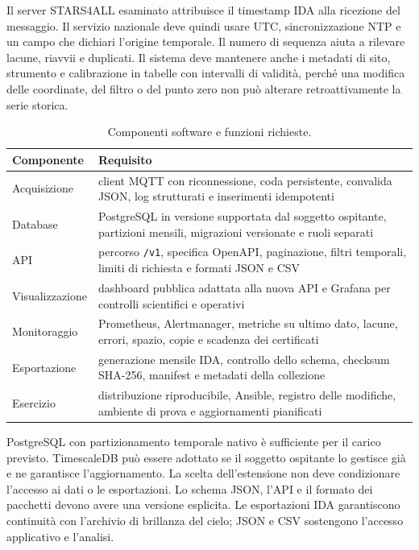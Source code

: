 \documentclass[11pt,a4paper]{report}
\begin{document}
Il server STARS4ALL esaminato attribuisce il timestamp IDA alla ricezione del messaggio. Il servizio nazionale deve quindi usare UTC, sincronizzazione NTP e un campo che dichiari l'origine temporale. Il numero di sequenza aiuta a rilevare lacune, riavvii e duplicati. Il sistema deve mantenere anche i metadati di sito, strumento e calibrazione in tabelle con intervalli di validità, perché una modifica delle coordinate, del filtro o del punto zero non può alterare retroattivamente la serie storica.

\begin{table}[ht!]
\centering
\renewcommand{\arraystretch}{1.5}
\small

\begin{tabularx}{\linewidth}{@{}l X@{}}
\toprule
Componente & Requisito \\
\midrule
Acquisizione & client MQTT con riconnessione, coda persistente, convalida JSON, log strutturati e inserimenti idempotenti \\
Database & PostgreSQL in versione supportata dal soggetto ospitante, partizioni mensili, migrazioni versionate e ruoli separati \\
API & percorso \texttt{/v1}, specifica OpenAPI, paginazione, filtri temporali, limiti di richiesta e formati JSON e CSV \\
Visualizzazione & dashboard pubblica adattata alla nuova API e Grafana per controlli scientifici e operativi \\
Monitoraggio & Prometheus, Alertmanager, metriche su ultimo dato, lacune, errori, spazio, copie e scadenza dei certificati \\
Esportazione & generazione mensile IDA, controllo dello schema, checksum SHA-256, manifest e metadati della collezione \\
Esercizio & distribuzione riproducibile, Ansible, registro delle modifiche, ambiente di prova e aggiornamenti pianificati \\
\bottomrule
\end{tabularx}

\caption{Componenti software e funzioni richieste.}
\label{tab:software}
\end{table}


PostgreSQL con partizionamento temporale nativo è sufficiente per il carico previsto. \mbox{TimescaleDB} può essere adottato se il soggetto ospitante lo gestisce già e ne garantisce l'aggiornamento. La scelta dell'estensione non deve condizionare l'accesso ai dati o le esportazioni. Lo schema JSON, l'API e il formato dei pacchetti devono avere una versione esplicita. Le esportazioni IDA garantiscono continuità con l'archivio di brillanza del cielo; JSON e CSV sostengono l'accesso applicativo e l'analisi.
\end{document}

